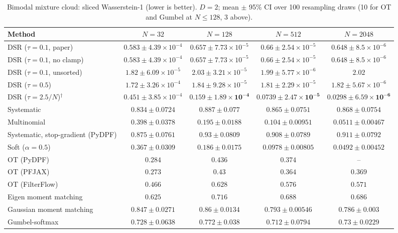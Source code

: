 \begin{table}[H]
\centering
\small
\caption{Bimodal mixture cloud: sliced Wasserstein-1 (lower is better). $D{=}2$; mean $\pm$ 95\% CI over 100 resampling draws (10 for OT and Gumbel at $N\le128$, 3 above).}
\label{tab:static-mixture-sliced_w1}
\begin{adjustbox}{max width=\linewidth}
\begin{tabular}{lcccc}
\toprule
Method & $N{=}32$ & $N{=}128$ & $N{=}512$ & $N{=}2048$ \\
\midrule
DSR ($\tau{=}0.1$, paper) & $0.583\pm4.39\times10^{-4}$ & $0.657\pm7.73\times10^{-5}$ & $0.66\pm2.54\times10^{-5}$ & $0.648\pm8.5\times10^{-6}$ \\
DSR ($\tau{=}0.1$, no clamp) & $0.583\pm4.39\times10^{-4}$ & $0.657\pm7.73\times10^{-5}$ & $0.66\pm2.54\times10^{-5}$ & $0.648\pm8.5\times10^{-6}$ \\
DSR ($\tau{=}0.1$, unsorted) & $1.82\pm6.09\times10^{-5}$ & $2.03\pm3.21\times10^{-5}$ & $1.99\pm5.77\times10^{-6}$ & $2.02$ \\
DSR ($\tau{=}0.5$) & $1.72\pm3.26\times10^{-4}$ & $1.84\pm9.28\times10^{-5}$ & $1.81\pm2.29\times10^{-5}$ & $1.82\pm5.67\times10^{-6}$ \\
DSR ($\tau{=}2.5/N$)$^\dagger$ & $0.451\pm3.85\times10^{-4}$ & $\mathbf{0.159\pm1.89\times10^{-4}}$ & $\mathbf{0.0739\pm2.47\times10^{-5}}$ & $\mathbf{0.0298\pm6.59\times10^{-6}}$ \\
\midrule
Systematic & $0.834\pm0.0724$ & $0.887\pm0.077$ & $0.865\pm0.0751$ & $0.868\pm0.0754$ \\
Multinomial & $0.398\pm0.0378$ & $0.195\pm0.0188$ & $0.104\pm0.00951$ & $0.0511\pm0.00467$ \\
Systematic, stop-gradient (PyDPF) & $0.875\pm0.0761$ & $0.93\pm0.0809$ & $0.908\pm0.0789$ & $0.911\pm0.0792$ \\
Soft ($\alpha{=}0.5$) & $0.367\pm0.0309$ & $0.186\pm0.0175$ & $0.0978\pm0.00805$ & $0.0492\pm0.00452$ \\
OT (PyDPF) & $0.284$ & $0.436$ & $0.374$ & -- \\
OT (PFJAX) & $\mathbf{0.273}$ & $0.43$ & $0.364$ & $0.369$ \\
OT (FilterFlow) & $0.466$ & $0.628$ & $0.576$ & $0.571$ \\
Eigen moment matching & $0.625$ & $0.716$ & $0.688$ & $0.686$ \\
Gaussian moment matching & $0.847\pm0.0271$ & $0.86\pm0.0134$ & $0.793\pm0.00546$ & $0.786\pm0.003$ \\
Gumbel-softmax & $0.728\pm0.0638$ & $0.772\pm0.038$ & $0.712\pm0.0794$ & $0.73\pm0.0229$ \\

\end{tabular}
\end{adjustbox}
\end{table}
